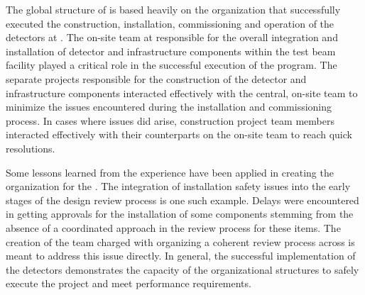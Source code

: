 The global structure of  is based heavily on 
the organization that successfully executed the construction,
installation, commissioning and operation of the 
detectors at .  The on-site team at  
responsible for the overall integration and installation of 
detector and infrastructure components within the test beam 
facility played a critical role in the successful execution of the 
 program.  The separate projects responsible for 
the construction of the detector and infrastructure components 
interacted effectively with the central, on-site team to minimize 
the issues encountered during the installation and commissioning 
process.  In cases where issues did arise, construction project 
team members interacted effectively with their counterparts on 
the on-site team to reach quick resolutions.

Some lessons learned from the  experience have 
been applied in creating the  organization for 
the  .  The integration of installation 
safety issues into the early stages of the design review process 
is one such example.  Delays were encountered in getting approvals 
for the installation of some  components stemming from 
the absence of a coordinated approach in the review process for 
these items.  The creation of the  team charged with 
organizing a coherent review process across  is 
meant to address this issue directly.  In general, the successful 
implementation of the  detectors demonstrates 
the capacity of the organizational structures to safely execute 
the project and meet performance requirements.
